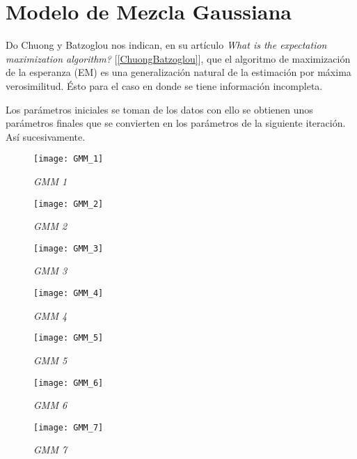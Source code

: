 \section{Modelo de Mezcla Gaussiana} \label{sec_GMM}

Do Chuong y Batzoglou nos indican, en su artículo \textit{What is the expectation maximization algorithm?} [\ref{ChuongBatzoglou}], que el algoritmo de maximización de la esperanza (EM) es una generalización natural de la estimación por máxima verosimilitud. Ésto para el caso en donde se tiene información incompleta.

Los parámetros iniciales se toman de los datos con ello se obtienen unos parámetros finales que se convierten en los parámetros de la siguiente iteración. Así sucesivamente.


\begin{figure}[H]
\centering
\texttt{[image: GMM\_1]} %
\caption{\textit{GMM 1}}
\end{figure}

\begin{figure}[H]
\centering
\texttt{[image: GMM\_2]} %
\caption{\textit{GMM 2}}
\end{figure}

\begin{figure}[H]
\centering
\texttt{[image: GMM\_3]} %
\caption{\textit{GMM 3}}
\end{figure}

\begin{figure}[H]
\centering
\texttt{[image: GMM\_4]} %
\caption{\textit{GMM 4}}
\end{figure}

\begin{figure}[H]
\centering
\texttt{[image: GMM\_5]} %
\caption{\textit{GMM 5}}
\end{figure}

\begin{figure}[H]
\centering
\texttt{[image: GMM\_6]} %
\caption{\textit{GMM 6}}
\end{figure}

\begin{figure}[H]
\centering
\texttt{[image: GMM\_7]} %
\caption{\textit{GMM 7}}
\end{figure}
